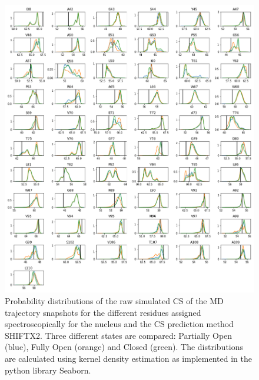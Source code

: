 \documentclass[%
 aip,
 amsmath,amssymb,
 preprint,%
]{revtex4-1}
\newcommand{\ca}{\ce{C_\alpha} }
\begin{document}
\begin{figure}[tbp]
	\includegraphics[width=\textwidth]{figures_SI/hist_shiftx2_CA.png}
	 \caption{\scriptsize
 Probability distributions of the raw simulated CS of the MD trajectory snapshots for the different residues assigned spectroscopically for the \ca nucleus and the CS prediction method SHIFTX2. Three different states are compared: Partially Open (blue), Fully Open (orange) and Closed (green). The distributions are calculated using kernel density estimation as implemented in the python library Seaborn. 
}
\label{SI_hist1}
\end{figure}
\end{document}
